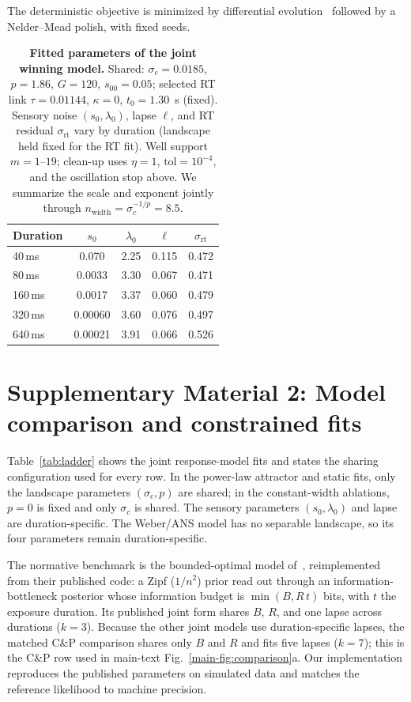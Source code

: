 \documentclass[Afour,sageh,times]{sagej}
\begin{document}
The deterministic objective is minimized by differential evolution~\citep{storn_differential_1997} followed by a Nelder--Mead polish, with fixed seeds.

\begin{table}[t]
  \centering
  \caption{\textbf{Fitted parameters of the joint winning model.} Shared: $\sigma_c=0.0185$, $p=1.86$, $G=120$, $s_{00}=0.05$; selected RT link $\tau=0.01144$, $\kappa=0$, $t_0=1.30$~s (fixed). Sensory noise $(s_0,\lambda_0)$, lapse $\ell$, and RT residual $\sigma_{\mathrm{rt}}$ vary by duration (landscape held fixed for the RT fit). Well support $m=1$--$19$; clean-up uses $\eta=1$, $\mathrm{tol}=10^{-4}$, and the oscillation stop above. We summarize the scale and exponent jointly through $n_{\mathrm{width}}=\sigma_c^{-1/p}=8.5$.}
  \label{tab:params}
  \setlength{\tabcolsep}{6pt}
  \begin{tabular}{lcccc}
  \hline
  Duration & $s_0$ & $\lambda_0$ & $\ell$ & $\sigma_{\mathrm{rt}}$ \\
  \hline
  40\,ms  & 0.070 & 2.25 & 0.115 & 0.472 \\
  80\,ms  & 0.0033 & 3.30 & 0.067 & 0.471 \\
  160\,ms & 0.0017 & 3.37 & 0.060 & 0.479 \\
  320\,ms & 0.00060 & 3.60 & 0.076 & 0.497 \\
  640\,ms & 0.00021 & 3.91 & 0.066 & 0.526 \\
  \hline
  \end{tabular}
\end{table}

\section{Supplementary Material 2: Model comparison and constrained fits}
\label{sm:comparison}

Table~\ref{tab:ladder} shows the joint response-model fits and states the sharing configuration used for every row. In the power-law attractor and static fits, only the landscape parameters $(\sigma_c,p)$ are shared; in the constant-width ablations, $p=0$ is fixed and only $\sigma_c$ is shared. The sensory parameters $(s_0,\lambda_0)$ and lapse are duration-specific. The Weber/ANS model has no separable landscape, so its four parameters remain duration-specific.

The normative benchmark is the bounded-optimal model of~\citet{cheyette_unified_2020}, reimplemented from their published code: a Zipf ($1/n^2$) prior read out through an information-bottleneck posterior whose information budget is $\min(B, R\,t)$ bits, with $t$ the exposure duration. Its published joint form shares $B$, $R$, and one lapse across durations ($k=3$). Because the other joint models use duration-specific lapses, the matched C\&P comparison shares only $B$ and $R$ and fits five lapses ($k=7$); this is the C\&P row used in main-text Fig.~\ref{main-fig:comparison}a. Our implementation reproduces the published parameters on simulated data and matches the reference likelihood to machine precision.
\end{document}
